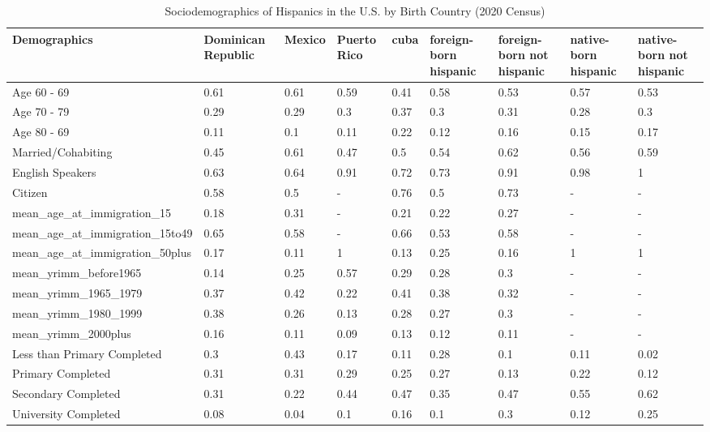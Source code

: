 \begin{table}[ht]
\centering
\caption{Sociodemographics of Hispanics in the U.S. by Birth Country (2020 Census)} 
\begingroup\small
\begin{tabular}{l|llllllll}
  \hline
Demographics & Dominican Republic & Mexico & Puerto Rico & cuba & foreign-born hispanic & foreign-born not hispanic & native-born hispanic & native-born not hispanic \\ 
  \hline
Age 60 - 69 & 0.61 & 0.61 & 0.59 & 0.41 & 0.58 & 0.53 & 0.57 & 0.53 \\ 
  Age 70 - 79 & 0.29 & 0.29 & 0.3 & 0.37 & 0.3 & 0.31 & 0.28 & 0.3 \\ 
  Age 80 - 69 & 0.11 & 0.1 & 0.11 & 0.22 & 0.12 & 0.16 & 0.15 & 0.17 \\ 
  Married/Cohabiting & 0.45 & 0.61 & 0.47 & 0.5 & 0.54 & 0.62 & 0.56 & 0.59 \\ 
  English Speakers & 0.63 & 0.64 & 0.91 & 0.72 & 0.73 & 0.91 & 0.98 & 1 \\ 
  Citizen & 0.58 & 0.5 & - & 0.76 & 0.5 & 0.73 & - & - \\ 
  mean\_age\_at\_immigration\_15 & 0.18 & 0.31 & - & 0.21 & 0.22 & 0.27 & - & - \\ 
  mean\_age\_at\_immigration\_15to49 & 0.65 & 0.58 & - & 0.66 & 0.53 & 0.58 & - & - \\ 
  mean\_age\_at\_immigration\_50plus & 0.17 & 0.11 & 1 & 0.13 & 0.25 & 0.16 & 1 & 1 \\ 
  mean\_yrimm\_before1965 & 0.14 & 0.25 & 0.57 & 0.29 & 0.28 & 0.3 & - & - \\ 
  mean\_yrimm\_1965\_1979 & 0.37 & 0.42 & 0.22 & 0.41 & 0.38 & 0.32 & - & - \\ 
  mean\_yrimm\_1980\_1999 & 0.38 & 0.26 & 0.13 & 0.28 & 0.27 & 0.3 & - & - \\ 
  mean\_yrimm\_2000plus & 0.16 & 0.11 & 0.09 & 0.13 & 0.12 & 0.11 & - & - \\ 
  Less than Primary Completed & 0.3 & 0.43 & 0.17 & 0.11 & 0.28 & 0.1 & 0.11 & 0.02 \\ 
  Primary Completed & 0.31 & 0.31 & 0.29 & 0.25 & 0.27 & 0.13 & 0.22 & 0.12 \\ 
  Secondary Completed & 0.31 & 0.22 & 0.44 & 0.47 & 0.35 & 0.47 & 0.55 & 0.62 \\ 
  University Completed & 0.08 & 0.04 & 0.1 & 0.16 & 0.1 & 0.3 & 0.12 & 0.25 \\ 
   \hline
\end{tabular}
\endgroup
\end{table}
